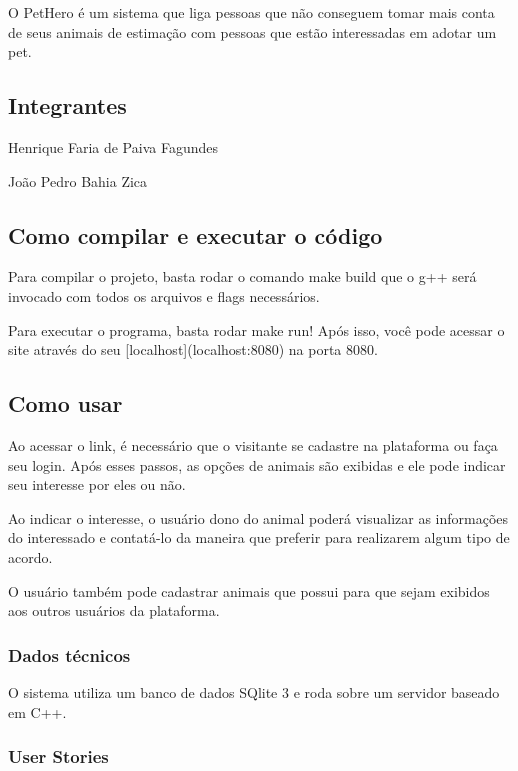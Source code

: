 O Pet\+Hero é um sistema que liga pessoas que não conseguem tomar mais conta de seus animais de estimação com pessoas que estão interessadas em adotar um pet.

\subsection*{Integrantes}


\begin{DoxyItemize}
\item Henrique Faria de Paiva Fagundes
\item João Pedro Bahia Zica
\end{DoxyItemize}

\subsection*{Como compilar e executar o código}

Para compilar o projeto, basta rodar o comando {\ttfamily make build} que o g++ será invocado com todos os arquivos e flags necessários.

Para executar o programa, basta rodar {\ttfamily make run}! Após isso, você pode acessar o site através do seu \mbox{[}localhost\mbox{]}(localhost\+:8080) na porta 8080.

\subsection*{Como usar}

Ao acessar o link, é necessário que o visitante se cadastre na plataforma ou faça seu login. Após esses passos, as opções de animais são exibidas e ele pode indicar seu interesse por eles ou não.

Ao indicar o interesse, o usuário dono do animal poderá visualizar as informações do interessado e contatá-\/lo da maneira que preferir para realizarem algum tipo de acordo.

O usuário também pode cadastrar animais que possui para que sejam exibidos aos outros usuários da plataforma.

\subsubsection*{Dados técnicos}

O sistema utiliza um banco de dados S\+Qlite 3 e roda sobre um servidor baseado em C++.

\subsubsection*{User Stories}

